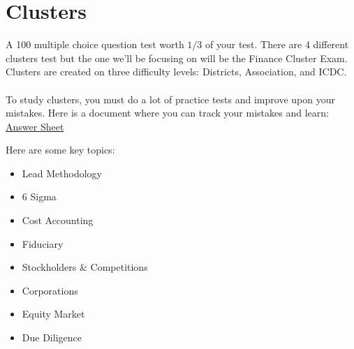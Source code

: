 \chapter{Clusters}
A 100 multiple choice question test worth
$1/3$ of your test. There are 4 different clusters test
but the one we'll be focusing on will be the Finance Cluster Exam. 
\noindent Clusters are created on three difficulty levels:
Districts, Association, and ICDC.\\\\


\noindent To study clusters, you must do a lot of practice tests
and improve upon your mistakes. Here is a document where 
you can track your mistakes and learn: \href{https://drive.google.com/file/d/1ZaLLyjglpAViEzdaigt7ltTns9uoNK7m/view}{Answer Sheet}


\noindent Here are some key topics:
\begin{itemize}
    \item Lead Methodology
    \item 6 Sigma
    \item Cost Accounting
    \item Fiduciary
    \item Stockholders \& Competitions
    \item Corporations
    \item Equity Market
    \item Due Diligence
\end{itemize}
